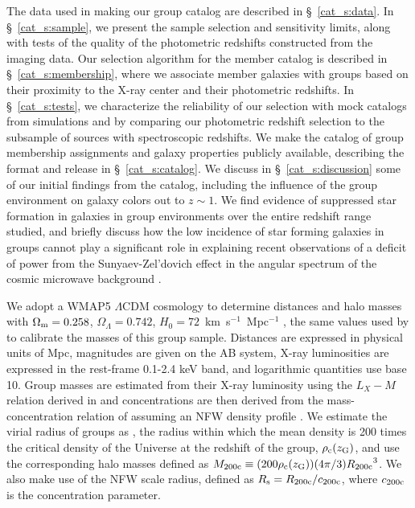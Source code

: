 The data used in making our group catalog are described in \S~\ref{cat_s:data}. 
In \S~\ref{cat_s:sample}, we present the sample selection and sensitivity
limits, along with tests of the quality of the
photometric redshifts constructed from the imaging data. 
Our selection algorithm for the member catalog is described in
\S~\ref{cat_s:membership}, where we associate member galaxies with groups based
on their proximity to the X-ray center and their photometric redshifts.
In \S~\ref{cat_s:tests}, we characterize the reliability of our selection
with mock catalogs from simulations and by comparing our photometric
redshift selection to the subsample of sources with spectroscopic redshifts.
We make the catalog of group membership assignments and galaxy
properties publicly available, describing the format and release in \S~\ref{cat_s:catalog}. We
discuss in \S~\ref{cat_s:discussion} some of our initial findings from the
catalog, including the influence of the group environment on galaxy colors
out to $z\sim 1$. We find evidence of suppressed star formation in
galaxies in group environments over the entire redshift range studied, and
briefly discuss how the low incidence of star forming galaxies in
groups cannot play a significant role in explaining recent
observations of a deficit of power from the Sunyaev-Zel'dovich effect
\citep[SZ;][]{Sunyaev1972} in the angular spectrum of the cosmic
microwave background \citep[CMB; e.g.,][]{Lueker2010, Fowler2010}.

We adopt a WMAP5 $\Lambda$CDM cosmology to determine distances and
halo masses with $\Omega_{\rm m}=0.258$, $\Omega_\Lambda=0.742$,
$H_0=72$~\rm{km~s}$^{-1}$~\rm{Mpc}$^{-1}$
\citep{Dunkley2009}, the same values used by \citet{Leauthaud2010} to
calibrate the masses of this group sample. Distances are expressed in physical units of
\rm{Mpc}, magnitudes are given on the AB system, X-ray
luminosities are expressed in the rest-frame 0.1-2.4 keV band, and
logarithmic quantities use base 10. Group
masses are estimated from their X-ray luminosity using the $L_X-M$
relation derived in \citet{Leauthaud2010} and concentrations are then derived
from the mass-concentration relation of \citet{Zhao2009} assuming an
NFW density profile \citep*{Navarro1996}. We estimate the virial radius
of groups as \rvir, the radius within which 
the mean density is 200 times the critical density of the Universe at
the redshift of the group, $\rho_{\rm{c}}(\mbox{$z_{\rm G}$})$, and use the
corresponding halo masses defined as $\mbox{$M_{200\rm{c}}$} \equiv
(200\rho_{\rm{c}}(\mbox{$z_{\rm G}$}))(4\pi/3)\mbox{$R_{200\rm{c}}$}^3$. We also make use of the NFW
scale radius, defined as $R_{\rm s}=\mbox{$R_{200\rm{c}}$}/c_{200\rm{c}}$, where
$c_{200\rm{c}}$ is the concentration parameter.


